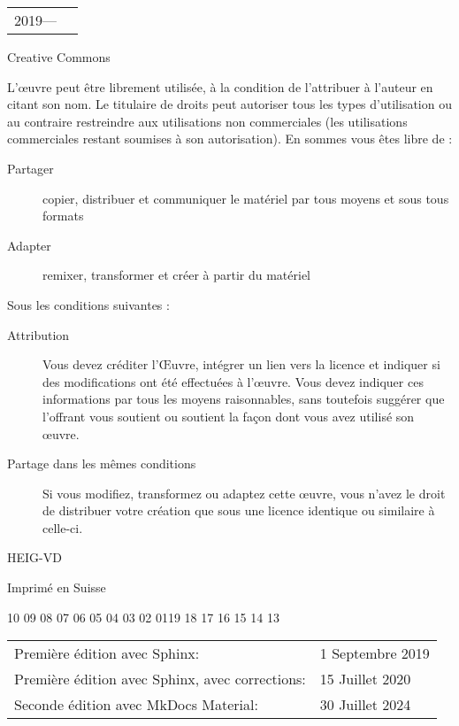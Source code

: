
\begingroup
\footnotesize
\setlength{\parindent}{0pt}
\setlength{\parskip}{\baselineskip}

\begin{tabular}{@{} l l}
  \textcopyright{} 2019\:---\:2025 & \author \\
\end{tabular}

Creative Commons \par
{}

L'œuvre peut être librement utilisée, à la condition de l'attribuer à l'auteur en citant son nom. Le titulaire de droits peut autoriser tous les types d'utilisation ou au contraire restreindre aux utilisations non commerciales (les utilisations commerciales restant soumises à son autorisation). En sommes vous êtes libre de :

\begin{description}
  \item[Partager] copier, distribuer et communiquer le matériel par tous moyens et sous tous formats
  \item[Adapter] remixer, transformer et créer à partir du matériel
\end{description}

Sous les conditions suivantes :

\begin{description}
  \item[Attribution] Vous devez créditer l'Œuvre, intégrer un lien vers la licence et indiquer si des modifications ont été effectuées à l'œuvre. Vous devez indiquer ces informations par tous les moyens raisonnables, sans toutefois suggérer que l'offrant vous soutient ou soutient la façon dont vous avez utilisé son œuvre.
  \item[Partage dans les mêmes conditions] Si vous modifiez, transformez ou adaptez cette œuvre, vous n'avez le droit de distribuer votre création que sous une licence identique ou similaire à celle-ci.
\end{description}

HEIG-VD

Imprimé en Suisse
\vfil
\begin{center}
  10 09 08 07 06 05 04 03 02 01\hspace{2em}19 18 17 16 15 14 13
\end{center}
\begin{center}
  \begin{tabular}{ll}
    Première édition avec Sphinx:                   & 1 Septembre 2019 \\
    Première édition avec Sphinx, avec corrections: & 15 Juillet 2020  \\
    Seconde édition avec MkDocs Material:           & 30 Juillet 2024  \\
  \end{tabular}
\end{center}
\vfil
\endgroup